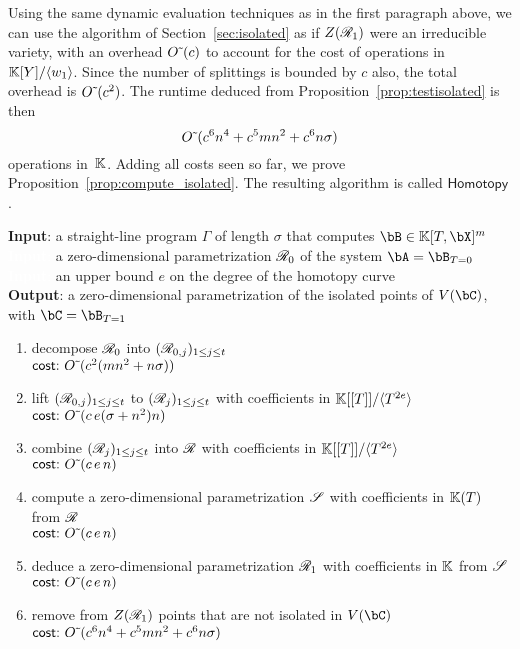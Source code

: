 \documentclass[12pt]{article}
\begin{document}
Using the same dynamic evaluation techniques as in the first paragraph
above, we can use the algorithm of Section~\ref{sec:isolated} as if
$Z(\mathscr{R}_1)$ were an irreducible variety, with an overhead ${O}{\,\tilde{ }\,}(c)$
to account for the cost of operations in $\mathbb{K}[Y]/\langle w_1 \rangle$.
Since the number of splittings is bounded by $c$ also, the total
overhead is ${O}{\,\tilde{ }\,}(c^2)$.  The runtime deduced from
Proposition~\ref{prop:testisolated} is then
$${O}{\,\tilde{ }\,}(c^6 n^4  +  c^5 m n^2  +c^6 n \sigma )$$ operations in~$\mathbb{K}$. Adding all
costs seen so far, we prove
Proposition~\ref{prop:compute_isolated}. The resulting algorithm
is called $\mathsf{Homotopy}$.




\begin{algorithm}
\caption{$\mathsf{Homotopy}(\Gamma,\scrR_0,e)$}
{\bf Input}: a straight-line program $\Gamma$ of length $\sigma$ that computes $\bB \in \KK[T,\bX]^m$\\
\textcolor{white}{{\bf Input}:} a zero-dimensional parametrization $\mathscr{R}_0$ of the system $\bA=\bB_{T=0}$\\
\textcolor{white}{{\bf Input}:} an upper bound $e$ on the degree of the homotopy curve\\
{\bf Output}: a zero-dimensional parametrization of the isolated points of $V(\bC)$, with $\bC=\bB_{T=1}$
\begin{enumerate}
  \setlength\itemsep{0em}
\item decompose $\mathscr{R}_0$ into $(\mathscr{R}_{0,j})_{1 \leq j \leq t}$\\
$\text{\sf{cost:~}} {O}{\,\tilde{ }\,}(c^2 (mn^2 + n\sigma) )$
\item lift $(\mathscr{R}_{0,j})_{1 \leq j \leq t}$ to $(\mathscr{R}_j)_{1\leq j \leq t}$ with 
  coefficients in $\mathbb{K}[[T]]/\langle T^{2e}\rangle$\\
$\text{\sf{cost:~}} {O}{\,\tilde{ }\,}(c\,e (\sigma+n^2)n)$
\item combine $(\mathscr{R}_j)_{1 \leq j \leq t}$ into  $\mathscr{R}$ with coefficients in $\mathbb{K}[[T]]/\langle T^{2e}\rangle$\\
$\text{\sf{cost:~}} {O}{\,\tilde{ }\,}(c\,e\,n)$
\item compute a zero-dimensional parametrization $\mathscr{S}$ with coefficients in $\mathbb{K}(T)$ from $\mathscr{R}$\\
$\text{\sf{cost:~}} {O}{\,\tilde{ }\,}(c\,e\,n)$
\item deduce a zero-dimensional parametrization $\mathscr{R}_1$ with coefficients in $\mathbb{K}$ from $\mathscr{S}$\\
$\text{\sf{cost:~}} {O}{\,\tilde{ }\,}(c\,e\,n)$
\item\label{step:homot:final} remove from $Z(\mathscr{R}_1)$ points that are not isolated in $V(\bC)$ \\
  $\text{\sf{cost:~}} {O}{\,\tilde{ }\,}(c^6 n^4  + c^5 m n^2   + c^6 n \sigma )$
\end{enumerate}
\label{DetSys}
\end{algorithm}
 
\end{document}
